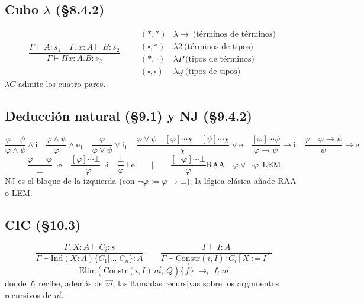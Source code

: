 \documentclass[11pt,a4paper]{article}
\newcommand{\Elim}{\mathrm{Elim}}
\newcommand{\Ind}{\mathrm{Ind}}
\newcommand{\Constr}{\mathrm{Constr}}
\begin{document}
\subsection*{Cubo \(\lambda\) (§8.4.2)}
\[
\frac{\Gamma\vdash A:s_1\quad\Gamma,x:A\vdash B:s_2}{\Gamma\vdash\Pi x{:}A.B:s_2}
\qquad
\begin{array}{ll}
(*,*) & \lambda\!\to\ \text{(términos de términos)}\\
(\square,*) & \lambda2\ \text{(términos de tipos)}\\
(*,\square) & \lambda P\ \text{(tipos de términos)}\\
(\square,\square) & \lambda\underline{\omega}\ \text{(tipos de tipos)}
\end{array}
\]
\(\lambda C\) admite los cuatro pares.

\subsection*{Deducción natural (§9.1) y NJ (§9.4.2)}
\[
\frac{\varphi\quad\psi}{\varphi\wedge\psi}\wedge\mathrm i
\quad
\frac{\varphi\wedge\psi}{\varphi}\wedge\mathrm e_1
\quad
\frac{\varphi}{\varphi\vee\psi}\vee\mathrm i_1
\quad
\frac{\varphi\vee\psi\quad[\varphi]\cdots\chi\quad[\psi]\cdots\chi}{\chi}\vee\mathrm e
\quad
\frac{[\varphi]\cdots\psi}{\varphi\to\psi}\to\mathrm i
\quad
\frac{\varphi\quad\varphi\to\psi}{\psi}\to\mathrm e
\]
\[
\frac{\varphi\quad\neg\varphi}{\bot}\neg\mathrm e
\quad
\frac{[\varphi]\cdots\bot}{\neg\varphi}\neg\mathrm i
\quad
\frac{\bot}{\varphi}\bot\mathrm e
\qquad\Big|\qquad
\frac{[\neg\varphi]\cdots\bot}{\varphi}\mathrm{RAA}
\quad
\varphi\vee\neg\varphi\ \ \mathrm{LEM}
\]
NJ es el bloque de la izquierda (con \(\neg\varphi:=\varphi\to\bot\)); la lógica
clásica añade RAA o LEM.

\subsection*{CIC (§10.3)}
\[
\frac{\Gamma,X:A\vdash C_i:s}{\Gamma\vdash\Ind(X:A)\{C_1|\dots|C_n\}:A}
\qquad
\frac{\Gamma\vdash I:A}{\Gamma\vdash\Constr(i,I):C_i[X:=I]}
\]
\[
\Elim(\Constr(i,I)\,\vec m,\,Q)\{\vec f\}\ \to_\iota\ f_i\ \vec m
\]
donde \(f_i\) recibe, además de \(\vec m\), las llamadas recursivas sobre los argumentos
recursivos de \(\vec m\).
\end{document}

